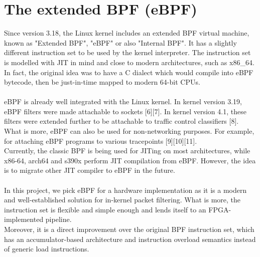 \documentclass{l4proj}
\begin{document}
\section{The extended BPF (eBPF)}
Since version 3.18, the Linux kernel includes an extended BPF virtual machine, known as "Extended BPF", "eBPF" or also "Internal BPF". It has a slightly different instruction set to be used by the kernel interpreter. The instruction set is modelled with JIT in mind and close to modern architectures, such as x86\_64. In fact, the original idea was to have a C dialect which would compile into eBPF bytecode, then be just-in-time mapped to modern 64-bit CPUs.\\\\
eBPF is already well integrated with the Linux kernel. In kernel version 3.19, eBPF filters were made attachable to sockets [6][7]. In kernel version 4.1, these filters were extended further to be attachable to traffic control classifiers [8]. What is more, eBPF can also be used for non-networking purposes. For example, for attaching eBPF programs to various tracepoints [9][10][11].\\
Currently, the classic BPF is being used for JITing on most architectures, while x86-64, arch64 and s390x perform JIT compilation from eBPF. However, the idea is to migrate other JIT compiler to eBPF in the future.\\\\
In this project, we pick eBPF for a hardware implementation as it is a modern and well-established solution for in-kernel packet filtering. What is more, the instruction set is flexible and simple enough and lends itself to an FPGA-implemented pipeline.\\
Moreover, it is a direct improvement over the original BPF instruction set, which has an accumulator-based architecture and instruction overload semantics instead of generic load instructions.
\end{document}
